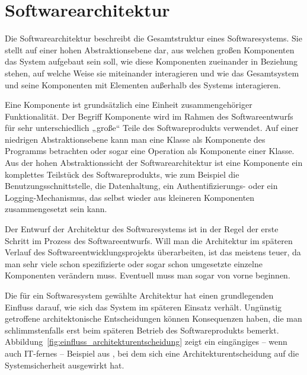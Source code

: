 \section{Softwarearchitektur}
\label{sec:Kap-7.1}

Die Softwarearchitektur beschreibt die Gesamtstruktur eines Softwaresystems. Sie stellt auf einer hohen Abstraktionsebene dar, aus welchen großen Komponenten das System aufgebaut sein soll, wie diese Komponenten zueinander in Beziehung stehen, auf welche Weise sie miteinander interagieren und wie das Gesamtsystem und seine Komponenten mit Elementen außerhalb des Systems interagieren.

\vspace{2mm} %

Eine Komponente ist grundsätzlich eine Einheit zusammengehöriger Funktionalität.  Der Begriff Komponente wird im Rahmen des Softwareentwurfs für sehr unterschiedlich „große“ Teile des Softwareprodukts verwendet. Auf einer niedrigen Abstraktions\-ebene kann man eine Klasse als Komponente des Programms betrachten oder sogar eine Operation als Komponente einer Klasse. Aus der hohen Abstraktions\-sicht der Softwarearchitektur ist eine Komponente ein komplettes Teilstück des Software\-produkts, wie zum Beispiel die Benutzungsschnittstelle, die Datenhaltung, ein Authentifizierungs- oder ein Logging-Mechanismus, das selbst wieder aus kleineren Komponenten zusammengesetzt sein kann.

\vspace{2mm} %

Der Entwurf der Architektur des Softwaresystems ist in der Regel der erste Schritt im Prozess des Softwareentwurfs. Will man die Architektur im späteren Verlauf des Softwareentwicklungsprojekts überarbeiten, ist das meistens teuer, da man sehr viele schon spezifizierte oder sogar schon umgesetzte einzelne Komponenten verändern muss. Eventuell muss man sogar von vorne beginnen.

\vspace{2mm} %

Die für ein Softwaresystem gewählte Architektur hat einen grundlegenden Einfluss darauf, wie sich das System im späteren Einsatz verhält. Ungünstig getroffene architektonische Entscheidungen können Konsequenzen haben, die man schlimmstenfalls erst beim späteren Betrieb des Softwareprodukts bemerkt. Abbildung~\ref{fig:einfluss_architekturentscheidung} zeigt ein eingängiges – wenn auch IT-fernes – Beispiel aus \cite[97]{som20}, bei dem sich eine Architekturentscheidung auf die Systemsicherheit ausgewirkt hat.

